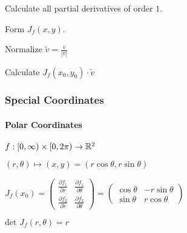 \begin{compactenum}
    \item Calculate all partial derivatives of order $1$.
    \item Form $J_f(x, y)$.
    \item Normalize $\tilde{v} = \frac{v}{|v|}$
    \item Calculate $J_f(x_0, y_0) \cdot \tilde{v}$
\end{compactenum}

\subsubsection{Special Coordinates}
\paragraph{Polar Coordinates}
\begin{inparaitem}
    \item $f: [0, \infty) \times [0, 2\pi) \to \mathbb{R}^2$
    \item $(r, \theta) \mapsto (x, y) = (r \cos \theta, r \sin \theta)$
    \item $J_f(x_0) =
        \begin{pmatrix}
            \frac{\partial f_1}{\partial r} & \frac{\partial f_1}{\partial \theta}\\
            \frac{\partial f_2}{\partial r} & \frac{\partial f_2}{\partial \theta}
        \end{pmatrix} =
        \begin{pmatrix}
            \cos \theta & -r \sin \theta\\
            \sin \theta & r \cos \theta
        \end{pmatrix}$
    \item $\text{det }J_f(r, \theta) = r$
\end{inparaitem}

